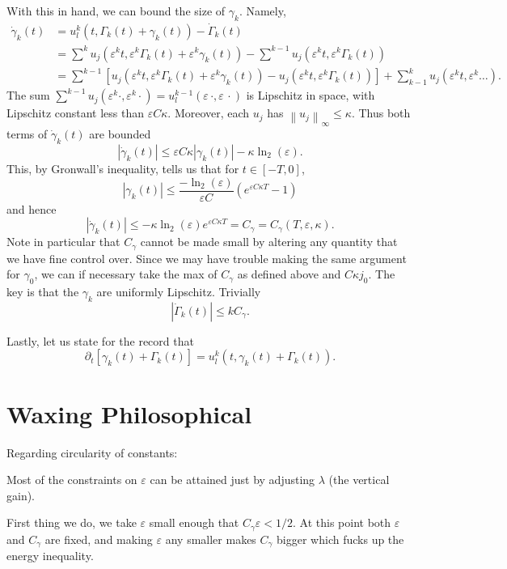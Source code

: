 \documentclass[11pt]{amsart}
\theoremstyle{remark}
\newcommand{\eps}{\varepsilon}
\newcommand{\norm}[1]{\left\lVert#1\right\rVert}
\newcommand{\paren}[1]{\left( #1 \right)}
\newcommand{\bracket}[1]{\left[ #1 \right]}
\newcommand{\del}{\partial}
\newcommand{\ulow}{u_l}
\newcommand{\ulowth}[1]{\ulow^{#1}}
\begin{document}
With this in hand, we can bound the size of $\gamma_k$.  Namely,
\begin{align*}
\dot{\gamma}_k(t) &= \ulowth{k}(t, \Gamma_k(t) + \gamma_k(t)) - \dot{\Gamma}_k(t)
\\ &= \sum^k u_j(\eps^k t, \eps^k \Gamma_k(t) + \eps^k \gamma_k(t)) - \sum^{k-1} u_j(\eps^k t, \eps^k \Gamma_k(t))
\\ &= \sum^{k-1} \bracket{u_j(\eps^k t, \eps^k \Gamma_k(t)+\eps^k \gamma_k(t)) - u_j(\eps^k t, \eps^k \Gamma_k(t))} + \sum_{k-1}^k u_j(\eps^k t, \eps^k \ldots).
\end{align*}
The sum $\sum^{k-1} u_j(\eps^k \cdot, \eps^k \cdot) = \ulowth{k-1}(\eps \, \cdot, \eps \, \cdot)$ is Lipschitz in space, with Lipschitz constant less than $\eps C \kappa$.  Moreover, each $u_j$ has $\norm{u_j}_\infty \leq \kappa$.  Thus both terms of $\dot{\gamma}_k(t)$ are bounded
\[ |\dot{\gamma}_k(t)| \leq \eps C \kappa |\gamma_k(t)| - \kappa \ln_2(\eps). \]
This, by Gronwall's inequality, tells us that for $t \in [-T,0]$,
\[ |\gamma_k(t)| \leq \frac{-\ln_2(\eps)}{\eps C} \paren{ e^{ \eps C \kappa T} - 1} \]
and hence
\[ |\dot{\gamma}_k(t)| \leq -\kappa \ln_2(\eps) e^{\eps C \kappa T} = C_\gamma = C_\gamma(T,\eps,\kappa). \]
Note in particular that $C_\gamma$ cannot be made small by altering any quantity that we have fine control over.  Since we may have trouble making the same argument for $\gamma_0$, we can if necessary take the max of $C_\gamma$ as defined above and $C \kappa j_0$.  The key is that the $\gamma_k$ are uniformly Lipschitz.  Trivially
\[ |\dot{\Gamma}_k(t)| \leq k C_\gamma. \]

Lastly, let us state for the record that
\[ \del_t \bracket{\gamma_k(t) + \Gamma_k(t)} = \ulowth{k}(t,\gamma_k(t)+\Gamma_k(t)). \]


\section{Waxing Philosophical}

Regarding circularity of constants:

Most of the constraints on $\eps$ can be attained just by adjusting $\lambda$ (the vertical gain).  

First thing we do, we take $\eps$ small enough that $C_\gamma \eps < 1/2$.  At this point both $\eps$ and $C_\gamma$ are fixed, and making $\eps$ any smaller makes $C_\gamma$ bigger which fucks up the energy inequality.  
\end{document}

